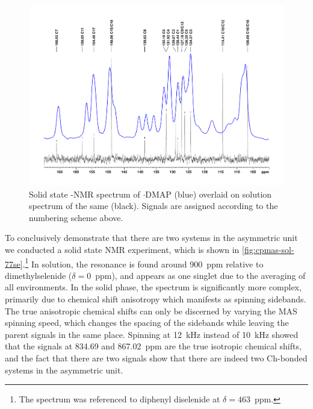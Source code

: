\begin{refsection}
\begin{figure}
    \includegraphics[width=\linewidth]{Figures/ebs-4ome-dmap-cpmas-sol-13c.pdf}
    \caption[Solid state -NMR spectrum of $ \cdot $DMAP.]{Solid state -NMR spectrum of $ \cdot $DMAP (blue) overlaid on solution spectrum of the same (black). Signals are assigned according to the numbering scheme above.}\label{fig:cpmas-sol-13c}
\end{figure}

To conclusively demonstrate that there are two systems in the asymmetric unit we conducted a solid state  NMR experiment, which is shown in \cref{fig:cpmas-sol-77se}.\footnote{The  spectrum was referenced to diphenyl diselenide at $\delta=463$~ppm.}
In solution, the  resonance is found around 900~ppm relative to dimethylselenide ($\delta=0$~ppm), and appears as one singlet due to the averaging of all environments.
In the solid phase, the spectrum is significantly more complex, primarily due to chemical shift anisotropy which manifests as spinning sidebands.
The true anisotropic chemical shifts can only be discerned by varying the MAS spinning speed, which changes the spacing of the sidebands while leaving the parent signals in the same place.
Spinning at 12~kHz instead of 10~kHz showed that the signals at 834.69 and 867.02~ppm are the true isotropic chemical shifts, and the fact that there are two signals show that there are indeed two Ch-bonded systems in the asymmetric unit.


\end{refsection}
